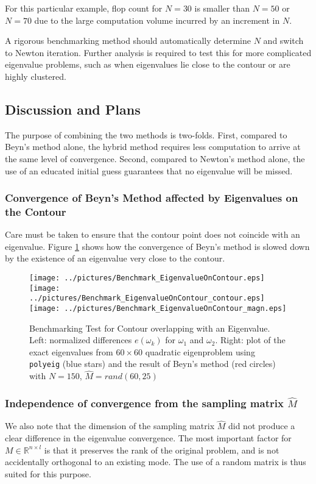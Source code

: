 \documentclass[11pt,letterpaper]{article}
\begin{document}
For this particular example, flop count for $N=30$ is smaller than $N=50$ or $N=70$ due to the large computation volume incurred by an increment in $N$. 




A rigorous benchmarking method should automatically determine $N$ and switch to Newton iteration. Further analysis is required to test this for more complicated eigenvalue problems, such as when eigenvalues lie close to the contour or are highly clustered.
\pagebreak
\subsection{Discussion and Plans}
The purpose of combining the two methods is two-folds. First, compared to Beyn's method alone, the hybrid method requires less computation to arrive at the same level of convergence. Second, compared to Newton's method alone, the use of an educated initial guess guarantees that no eigenvalue will be missed.
\subsubsection{Convergence of Beyn's Method affected by Eigenvalues on the Contour}
Care must be taken to ensure that the contour point does not coincide with an eigenvalue. Figure \ref{fig:overlap} shows how the convergence of Beyn's method is slowed down by the existence of an eigenvalue very close to the contour.
\begin{figure}\label{fig:overlap}
\begin{center}
\texttt{[image: ../pictures/Benchmark\_EigenvalueOnContour.eps]}\\
\texttt{[image: ../pictures/Benchmark\_EigenvalueOnContour\_contour.eps]}
\texttt{[image: ../pictures/Benchmark\_EigenvalueOnContour\_magn.eps]}
\end{center}
\caption{Benchmarking Test for Contour overlapping with an Eigenvalue. \textnormal{Left: normalized differences $e(\omega_k)$ for $\omega_1$ and $\omega_2$. Right: plot of the exact eigenvalues from $60 \times 60$ quadratic eigenproblem using {\tt polyeig} (blue stars) and the result of Beyn's method (red circles) with $N=150$, $\hat{M}=rand(60,25)$}}
\end{figure}

\subsubsection{Independence of convergence from the sampling matrix $\hat{M}$}
We also note that the dimension of the sampling matrix $\hat{M}$ did not produce a clear difference in the eigenvalue convergence. The most important factor for $M\in \mathbb{R}^{n\times l}$ is that it preserves the rank of the original problem, and is not accidentally orthogonal to an existing mode. The use of a random matrix is thus suited for this purpose.
\end{document}
